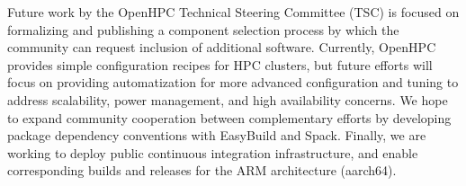 \documentclass{sig-alternate-05-2015}
\begin{document}
Future work by the OpenHPC Technical Steering Committee (TSC) is focused on
formalizing and publishing a component selection process by which the community
can request inclusion of additional software. Currently, OpenHPC provides simple
configuration recipes for HPC clusters, but future efforts will focus on 
providing automatization for more advanced configuration and tuning to address
scalability, power management, and high availability concerns. We hope to
expand community cooperation between complementary efforts by 
developing package dependency conventions with EasyBuild and Spack. Finally, we
are working to deploy public continuous integration infrastructure, and
enable corresponding builds and releases for the ARM architecture (aarch64).




\end{document}

